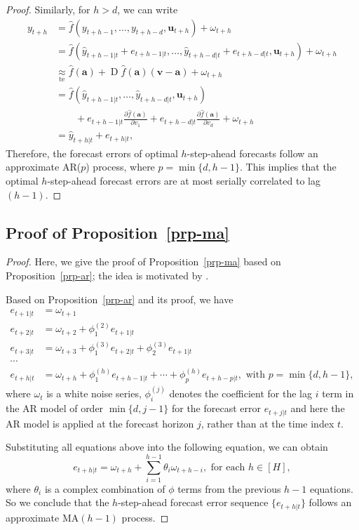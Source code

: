 \documentclass[
  11pt,
  a4paper,
]{article}
\theoremstyle{plain}
\theoremstyle{remark}
\begin{document}
\begin{proof}
Similarly, for \(h > d\), we can write \begin{align*}
y_{t+h}
&= \hat{f}(y_{t+h-1},\dots,y_{t+h-d},\bm{u}_{t+h})+\omega_{t+h} \\
&= \hat{f}(\hat{y}_{t+h-1|t}+e_{t+h-1|t},\dots,\hat{y}_{t+h-d|t}+e_{t+h-d|t},\bm{u}_{t+h})+\omega_{t+h} \\
&\underset{\text{te}}{\approx} \hat{f}(\bm{a})+\operatorname{D}\hat{f}(\bm{a})(\bm{v}-\bm{a})+
\omega_{t+h} \\
&= \hat{f}(\hat{y}_{t+h-1|t},\dots,\hat{y}_{t+h-d|t},\bm{u}_{t+h}) \\
&\mbox{}\qquad +e_{t+h-1|t}\frac{\partial \hat{f}(\bm{a})}{\partial v_1}+e_{t+h-d|t}\frac{\partial \hat{f}(\bm{a})}{\partial v_{d}}+\omega_{t+h} \\
&= \hat{y}_{t+h|t}+e_{t+h|t},
\end{align*} Therefore, the forecast errors of optimal \(h\)-step-ahead
forecasts follow an approximate AR(\(p\)) process, where
\(p=\min\{d, h-1\}\). This implies that the optimal \(h\)-step-ahead
forecast errors are at most serially correlated to lag \((h-1)\).
\end{proof}

\subsection{\texorpdfstring{Proof of
Proposition~\ref{prp-ma}}{Proof of Proposition~}}\label{sec-proof_ma}

\begin{proof}
Here, we give the proof of Proposition~\ref{prp-ma} based on
Proposition~\ref{prp-ar}; the idea is motivated by
\textcite{sommer2023}.

Based on Proposition~\ref{prp-ar} and its proof, we have \begin{align*}
e_{t+1|t} &= \omega_{t+1} \\
e_{t+2|t} &= \omega_{t+2} + \phi_{1}^{(2)}e_{t+1|t} \\
e_{t+3|t} &= \omega_{t+3} + \phi_{1}^{(3)}e_{t+2|t} + \phi_{2}^{(3)}e_{t+1|t} \\
\cdots \\
e_{t+h|t} & = \omega_{t+h} + \phi_{1}^{(h)}e_{t+h-1|t} + \cdots + \phi_{p}^{(h)}e_{t+h-p|t}, \text{ with } p = \min\{d, h-1\},
\end{align*} where \(\omega_t\) is a white noise series,
\(\phi_i^{(j)}\) denotes the coefficient for the lag \(i\) term in the
AR model of order \(\min\{d, j-1\}\) for the forecast error
\(e_{t+j|t}\) and here the AR model is applied at the forecast horizon
\(j\), rather than at the time index \(t\).

Substituting all equations above into the following equation, we can
obtain \[
e_{t+h|t} = \omega_{t+h} + \sum_{i=1}^{h-1}\theta_{i}\omega_{t+h-i}, \text{ for each } h\in[H],
\] where \(\theta_{i}\) is a complex combination of \(\phi\) terms from
the previous \(h-1\) equations. So we conclude that the \(h\)-step-ahead
forecast error sequence \(\{e_{t+h|t}\}\) follows an approximate
MA\((h-1)\) process.
\end{proof}
\end{document}
